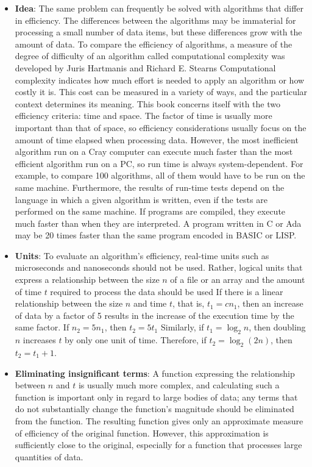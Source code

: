 \documentclass{report}
\begin{document}
    \pagebreak 
    \bigbreak \noindent 
   \begin{itemize}
       \item \textbf{Idea}: The same problem can frequently be solved with algorithms that differ in efficiency. The differences between the algorithms may be immaterial for processing a small number of data items, but these differences grow with the amount of data. To compare the efficiency of algorithms, a measure of the degree of difficulty of an algorithm called computational complexity was developed by Juris Hartmanis and Richard E. Stearns
           \bigbreak \noindent 
           Computational complexity indicates how much effort is needed to apply an algorithm or how costly it is. This cost can be measured in a variety of ways, and the particular context determines its meaning. This book concerns itself with the two efficiency criteria: time and space. The factor of time is usually more important than that of space, so efficiency considerations usually focus on the amount of time elapsed when processing data. However, the most inefficient algorithm run on a Cray computer can execute much faster than the most efficient algorithm run on a PC, so run time is always system-dependent. For example, to compare 100 algorithms, all of them would have to be run on the same machine. Furthermore, the results of run-time tests depend on the language in which a given algorithm is written, even if the tests are performed on the same machine. If programs are compiled, they execute much faster than when they are interpreted. A program written in C or Ada may be 20 times faster than the same program encoded in BASIC or LISP.
        \item \textbf{Units}: To evaluate an algorithm’s efficiency, real-time units such as microseconds and nanoseconds should not be used. Rather, logical units that express a relationship between the size $n$ of a file or an array and the amount of time $t$ required to process the data should be used
            \bigbreak \noindent 
            If there is a linear relationship between the size $n$ and time $t$, that is, $t_{1} = cn_{1}$, then an increase of data by a factor of 5 results in the increase of the execution time by the same factor. If $n_{2} = 5n_{1}$, then $t_{2}= 5t_{1} $
            \bigbreak \noindent 
            Similarly, if $t_1 = \log_2 n$, then doubling $n$ increases $t$ by only one unit of time. Therefore, if $t_2 = \log_2(2n)$, then $t_2 = t_1 + 1$.
        \item \textbf{Eliminating insignificant terms}: A function expressing the relationship between $n$ and $t$ is usually much more complex, and calculating such a function is important only in regard to large bodies of data; any terms that do not substantially change the function’s magnitude should  be eliminated from the function. The resulting function gives only an approximate measure of efficiency of the original function. However, this approximation is sufficiently close to the original, especially for a function that processes large quantities of data.

\end{itemize}
\end{document}
